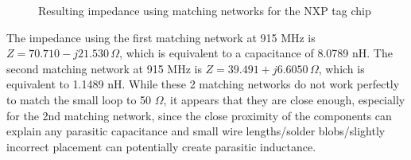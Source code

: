 \documentclass[12pt,onecolumn,titlepage]{article}
\begin{document}
\begin{figure}[h!]
	\centering
	\label{fig:LOOP_SNGL_TURN_SALINE_AGILENTCAL_MATCH_NOCORR_smithchart}
	\caption{Resulting impedance using matching networks for the NXP tag chip}
\end{figure}

The impedance using the first matching network at 915 MHz is $Z=70.710-j21.530 \, \Omega$, which is equivalent to a capacitance of 8.0789 nH. The second matching network at 915 MHz is $Z=39.491+j6.6050 \, \Omega$, which is equivalent to 1.1489 nH. While these 2 matching networks do not work perfectly to match the small loop to 50 $\Omega$, it appears that they are close enough, especially for the 2nd matching network, since the close proximity of the components can explain any parasitic capacitance and small wire lengths/solder blobs/slightly incorrect placement can potentially create parasitic inductance. 
\end{document}
